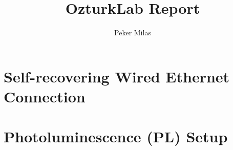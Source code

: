 \documentclass[letter,10pt,titlepage]{article}
\begin{document}
\title{OzturkLab Report}
\author{Peker Milas}
\maketitle

\tableofcontents
\newpage

\section{Self-recovering Wired Ethernet Connection}

 
\section{Photoluminescence (PL) Setup}

\end{document}

